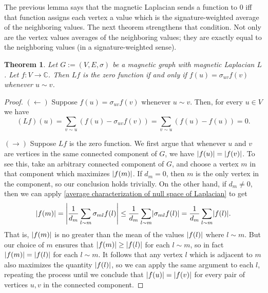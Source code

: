 \documentclass{article}
\newtheorem{thm}{Theorem}
\theoremstyle{definition}
\newcommand{\C}{\mathbb C}
\DeclarePairedDelimiter\abs{\lvert}{\rvert}
\begin{document}
The previous lemma says that the magnetic Laplacian sends a function to 0 iff that function assigns each vertex a value which is the signature-weighted average of the neighboring values. The next theorem strengthens that condition. Not only are the vertex values averages of the neighboring values; they are exactly equal to the neighboring values (in a signature-weighted sense).

\begin{thm}\label{equality characterization of null space of Laplacian}
    Let $G := (V, E, \sigma)$ be a magnetic graph with magnetic Laplacian $L$. Let $f:V \rightarrow \C$. Then $L f$ is the zero function if and only if $f(u) = \sigma_{uv} f(v)$ whenever $u \sim v$.
\end{thm}
\begin{proof}
    $(\leftarrow)$ Suppose $f(u) = \sigma_{uv} f(v)$ whenever $u \sim v$. Then, for every $u \in V$ we have
    $$
    (L f)(u) 
    = \sum_{v \sim u}(f(u) - \sigma_{uv} f(v))
    = \sum_{v \sim u}(f(u) - f(u))
    = 0.
    $$ 
    
    $(\rightarrow)$ Suppose $L f$ is the zero function. We first argue that whenever $u$ and $v$ are vertices in the same connected component of $G$, we have $\abs*{f(u)} = \abs*{f(v)}$. To see this, take an arbitrary connected component of $G$, and choose a vertex $m$ in that component which maximizes $\abs*{f(m)}$. If $d_m = 0$, then $m$ is the only vertex in the component, so our conclusion holds trivially. On the other hand, if $d_m \neq 0$, then we can apply \cref{average characterization of null space of Laplacian} to get
    $$
        \abs*{f(m)} 
        = \abs*{\frac{1}{d_m} \sum_{l \sim m} \sigma_{ml} f(l)} 
        \leq \frac{1}{d_m} \sum_{l \sim m} \abs*{\sigma_{ml} f(l)} 
        = \frac{1}{d_m} \sum_{l \sim m} \abs*{f(l)}.
    $$
    That is, $\abs*{f(m)}$ is no greater than the mean of the values $\abs{f(l)}$ where $l \sim m$. But our choice of $m$ ensures that $\abs*{f(m)} \geq \abs*{f(l)}$ for each $l \sim m$, so in fact $\abs*{f(m)} = \abs*{f(l)}$ for each $l \sim m$. It follows that any vertex $l$ which is adjacent to $m$ also maximizes the quantity $\abs*{f(l)}$, so we can apply the same argument to each $l$, repeating the process until we conclude that $\abs*{f(u)} = \abs*{f(v)}$ for every pair of vertices $u, v$ in the connected component.
    

\end{proof}
\end{document}
